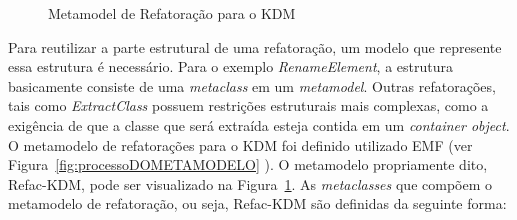 \begin{figure}[h]
 \centering
\caption{Metamodel de Refatoração para o KDM}
 \label{fig:METAMODELO}
\end{figure}
\FloatBarrier
Para reutilizar a parte estrutural de uma refatoração, um modelo que represente essa estrutura é necessário. Para o exemplo \textit{RenameElement}, a estrutura basicamente consiste de uma \textit{metaclass} em um \textit{metamodel}. Outras refatorações, tais como \textit{ExtractClass} possuem restrições estruturais mais complexas, como a exigência de que a classe que será extraída esteja contida em um \textit{container object}. O metamodelo de refatorações para o KDM foi definido utilizado EMF (ver Figura~\ref{fig:processoDOMETAMODELO} ). O metamodelo propriamente dito, Refac-KDM, pode ser visualizado na Figura~\ref{fig:METAMODELO}. As \textit{metaclasses} que compõem o metamodelo de refatoração, ou seja, Refac-KDM são definidas da seguinte forma:
 
